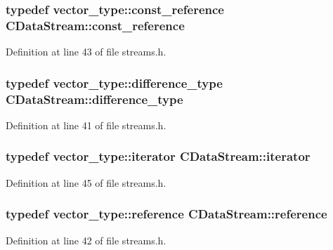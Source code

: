 \subsubsection[{const\+\_\+reference}]{\setlength{\rightskip}{0pt plus 5cm}typedef vector\+\_\+type\+::const\+\_\+reference {\bf C\+Data\+Stream\+::const\+\_\+reference}}\label{class_c_data_stream_ada2ac4b4c962dd5a5dcccbc3f71e83ab}


Definition at line 43 of file streams.\+h.

\hypertarget{class_c_data_stream_a9da973fb6e53a5335db78b6f8b90bdbf}{}
\subsubsection[{difference\+\_\+type}]{\setlength{\rightskip}{0pt plus 5cm}typedef vector\+\_\+type\+::difference\+\_\+type {\bf C\+Data\+Stream\+::difference\+\_\+type}}\label{class_c_data_stream_a9da973fb6e53a5335db78b6f8b90bdbf}


Definition at line 41 of file streams.\+h.

\hypertarget{class_c_data_stream_abed2013224bdf424e51c78bf483886d3}{}
\subsubsection[{iterator}]{\setlength{\rightskip}{0pt plus 5cm}typedef vector\+\_\+type\+::iterator {\bf C\+Data\+Stream\+::iterator}}\label{class_c_data_stream_abed2013224bdf424e51c78bf483886d3}


Definition at line 45 of file streams.\+h.

\hypertarget{class_c_data_stream_a33723921305add93b45973243faf1541}{}
\subsubsection[{reference}]{\setlength{\rightskip}{0pt plus 5cm}typedef vector\+\_\+type\+::reference {\bf C\+Data\+Stream\+::reference}}\label{class_c_data_stream_a33723921305add93b45973243faf1541}


Definition at line 42 of file streams.\+h.

